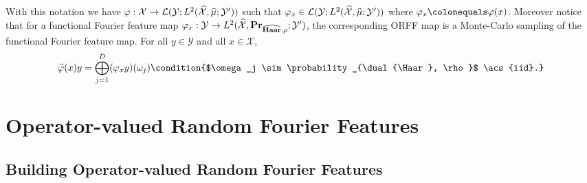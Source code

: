 With this notation we have $\Phi: \mathcal{X} \to \mathcal{L}(\mathcal{Y};
L^2(\dual{\mathcal{X}}, \dual{\mu}; \mathcal{Y}'))$ such that $\Phi_x\in
\mathcal{L}(\mathcal{Y}; L^2(\dual{\mathcal{X}}, \dual{\mu}; \mathcal{Y}'))$
where $\Phi_x\colonequals\Phi(x)$. Moreover notice that for a functional
Fourier feature map $\Phi_x: \mathcal{Y} \to L^2(\dual{\mathcal{X}},
\probability_{\dual{\Haar}, \rho}; \mathcal{Y}' )$, the corresponding
\acs{ORFF} map is a Monte-Carlo sampling of the functional Fourier feature map.
For all $y\in\mathcal{Y}$ and all $x\in\mathcal{X}$,
\begin{dmath*}
    \tildePhi{\omega}(x)y = \Vect_{j=1}^D (\Phi_x y)(\omega_j)
    \condition{$\omega_j \sim \probability_{\dual{\Haar}, \rho}$ \acs{iid}.}
\end{dmath*}

\section{Operator-valued Random Fourier Features}
\label{sec:building_ORFF} 
\subsection{Building Operator-valued Random Fourier Features}

